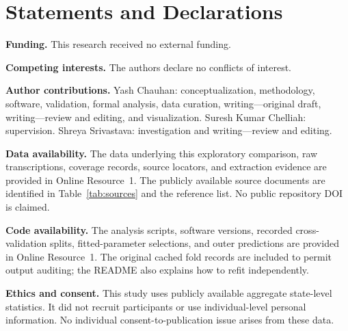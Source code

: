 \documentclass[11pt,a4paper]{article}
\begin{document}
\section*{Statements and Declarations}
\textbf{Funding.} This research received no external funding.

\textbf{Competing interests.} The authors declare no conflicts of interest.

\textbf{Author contributions.} Yash Chauhan: conceptualization, methodology, software, validation, formal analysis, data curation, writing---original draft, writing---review and editing, and visualization. Suresh Kumar Chelliah: supervision. Shreya Srivastava: investigation and writing---review and editing.

\textbf{Data availability.} The data underlying this exploratory comparison, raw transcriptions, coverage records, source locators, and extraction evidence are provided in Online Resource~1. The publicly available source documents are identified in Table~\ref{tab:sources} and the reference list. No public repository DOI is claimed.

\textbf{Code availability.} The analysis scripts, software versions, recorded cross-validation splits, fitted-parameter selections, and outer predictions are provided in Online Resource~1. The original cached fold records are included to permit output auditing; the README also explains how to refit independently.

\begin{samepage}
\textbf{Ethics and consent.} This study uses publicly available aggregate state-level statistics. It did not recruit participants or use individual-level personal information. No individual consent-to-publication issue arises from these data.
\par\end{samepage}
\end{document}
